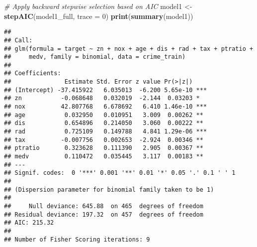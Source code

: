 \documentclass[
]{article}
\newenvironment{Shaded}{\begin{snugshade}}{\end{snugshade}}
\newcommand{\AttributeTok}[1]{\textcolor[rgb]{0.13,0.29,0.53}{#1}}
\newcommand{\CommentTok}[1]{\textcolor[rgb]{0.56,0.35,0.01}{\textit{#1}}}
\newcommand{\DecValTok}[1]{\textcolor[rgb]{0.00,0.00,0.81}{#1}}
\newcommand{\FloatTok}[1]{\textcolor[rgb]{0.00,0.00,0.81}{#1}}
\newcommand{\FunctionTok}[1]{\textcolor[rgb]{0.13,0.29,0.53}{\textbf{#1}}}
\newcommand{\NormalTok}[1]{#1}
\newcommand{\OtherTok}[1]{\textcolor[rgb]{0.56,0.35,0.01}{#1}}
\newcommand{\SpecialCharTok}[1]{\textcolor[rgb]{0.81,0.36,0.00}{\textbf{#1}}}
\newcommand{\StringTok}[1]{\textcolor[rgb]{0.31,0.60,0.02}{#1}}
\begin{document}
\begin{Shaded}
\begin{Highlighting}[]
\CommentTok{\# Apply backward stepwise selection based on AIC}
\NormalTok{model1 }\OtherTok{\textless{}{-}} \FunctionTok{stepAIC}\NormalTok{(model1\_full, }\AttributeTok{trace =} \DecValTok{0}\NormalTok{)}
\FunctionTok{print}\NormalTok{(}\FunctionTok{summary}\NormalTok{(model1))}
\end{Highlighting}
\end{Shaded}

\begin{verbatim}
## 
## Call:
## glm(formula = target ~ zn + nox + age + dis + rad + tax + ptratio + 
##     medv, family = binomial, data = crime_train)
## 
## Coefficients:
##               Estimate Std. Error z value Pr(>|z|)    
## (Intercept) -37.415922   6.035013  -6.200 5.65e-10 ***
## zn           -0.068648   0.032019  -2.144  0.03203 *  
## nox          42.807768   6.678692   6.410 1.46e-10 ***
## age           0.032950   0.010951   3.009  0.00262 ** 
## dis           0.654896   0.214050   3.060  0.00222 ** 
## rad           0.725109   0.149788   4.841 1.29e-06 ***
## tax          -0.007756   0.002653  -2.924  0.00346 ** 
## ptratio       0.323628   0.111390   2.905  0.00367 ** 
## medv          0.110472   0.035445   3.117  0.00183 ** 
## ---
## Signif. codes:  0 '***' 0.001 '**' 0.01 '*' 0.05 '.' 0.1 ' ' 1
## 
## (Dispersion parameter for binomial family taken to be 1)
## 
##     Null deviance: 645.88  on 465  degrees of freedom
## Residual deviance: 197.32  on 457  degrees of freedom
## AIC: 215.32
## 
## Number of Fisher Scoring iterations: 9
\end{verbatim}

\begin{Shaded}
\end{Shaded}
\end{document}
